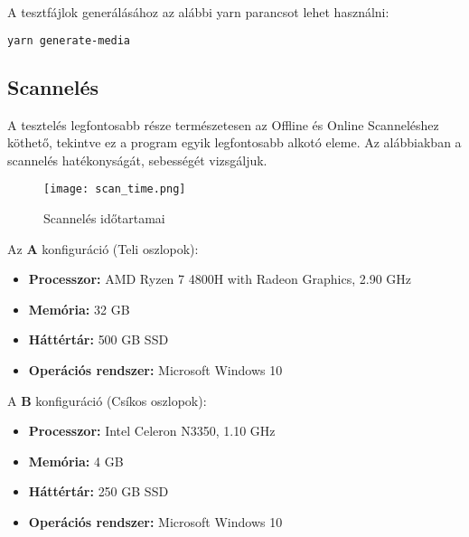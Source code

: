 A tesztfájlok generálásához az alábbi yarn parancsot lehet használni:
\begin{lstlisting}[language={Bash}, numbers={none}]
    yarn generate-media
\end{lstlisting}

\subsection{Scannelés}
A tesztelés legfontosabb része természetesen az Offline és Online Scanneléshez köthető, tekintve ez a program egyik legfontosabb alkotó eleme. Az alábbiakban a scannelés hatékonyságát, sebességét vizsgáljuk.

\begin{figure}[H]
	\centering
	\texttt{[image: scan\_time.png]}
	\caption{Scannelés időtartamai}
	\label{fig:scan_time}
\end{figure}

{\noindent Az {\textbf A konfiguráció} (Teli oszlopok):}
\begin{itemize}
    \item {\textbf {Processzor: }} AMD Ryzen 7 4800H with Radeon Graphics, 2.90 GHz
    \item {\textbf {Memória: }} 32 GB
    \item {\textbf {Háttértár: }} 500 GB SSD
    \item {\textbf {Operációs rendszer: }} Microsoft Windows 10
\end{itemize}
A {\textbf B konfiguráció} (Csíkos oszlopok):
\begin{itemize}
    \item {\textbf {Processzor: }} Intel Celeron N3350, 1.10 GHz
    \item {\textbf {Memória: }} 4 GB
    \item {\textbf {Háttértár: }} 250 GB SSD
    \item {\textbf {Operációs rendszer: }} Microsoft Windows 10
\end{itemize}

